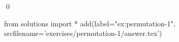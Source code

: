 
\begin{ex} 
  \label{ex:permutation-1}
  
  \qed
\end{ex} 
\begin{python0}
from solutions import *
add(label="ex:permutation-1",
    srcfilename='exercises/permutation-1/answer.tex') 
\end{python0}
